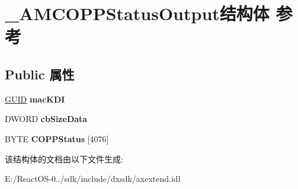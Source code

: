 \hypertarget{struct___a_m_c_o_p_p_status_output}{}\section{\+\_\+\+A\+M\+C\+O\+P\+P\+Status\+Output结构体 参考}
\label{struct___a_m_c_o_p_p_status_output}
\subsection*{Public 属性}
\begin{DoxyCompactItemize}
\item 
\mbox{\label{struct___a_m_c_o_p_p_status_output_a6b30a3f9f04177bff8fe88d0475e01af}} 
\hyperlink{interface_g_u_i_d}{G\+U\+ID} {\bfseries mac\+K\+DI}
\item 
\mbox{\label{struct___a_m_c_o_p_p_status_output_a6712c20c4e69af62b50801aa42d8542e}} 
D\+W\+O\+RD {\bfseries cb\+Size\+Data}
\item 
\mbox{\label{struct___a_m_c_o_p_p_status_output_aa3e16615e791232f9187eb50767ecd71}} 
B\+Y\+TE {\bfseries C\+O\+P\+P\+Status} \mbox{[}4076\mbox{]}
\end{DoxyCompactItemize}


该结构体的文档由以下文件生成\+:\begin{DoxyCompactItemize}
\item 
E\+:/\+React\+O\+S-\/0../sdk/include/dxsdk/axextend.\+idl\end{DoxyCompactItemize}
